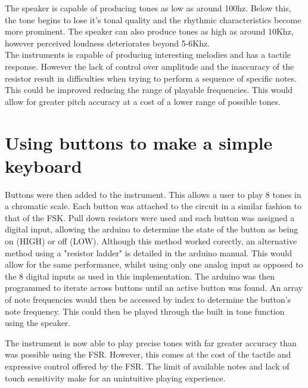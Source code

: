 \documentclass[titlepage]{scrartcl}
\begin{document}
    \begin{figure}[H]
    \end{figure}

    The speaker is capable of producing tones as low as around 100hz. Below
    this, the tone begins to lose it's tonal quality and the rhythmic
    characteristics become more prominent. The speaker can also produce tones
    as high as around 10Khz, however perceived loudness deteriorates beyond
    5-6Khz.\\
    The instruments is capable of producing interesting melodies and has a
    tactile response. However the lack of control over amplitude and the
    inaccuracy of the resistor result in difficulties when trying to perform a
    sequence of specific notes. This could be improved reducing the range of
    playable frequencies. This would allow for greater pitch accuracy at a cost
    of a lower range of possible tones.

    \section{Using buttons to make a simple keyboard}
    Buttons were then added to the instrument. This allows a user to play 8
    tones in a chromatic scale. Each button was attached to the circuit in a
    similar fashion to that of the FSK. Pull down resistors were used and each
    button was assigned a digital input, allowing the arduino to determine the
    state of the button as being on (HIGH) or off (LOW). Although this method
    worked corectly, an alternative method using a "resistor ladder" is
    detailed in the arduino manual. This would allow for the same performance,
    whilst using only one analog input as opposed to the 8 digital inputs as
    used in this implementation.
    The arduino was then programmed to iterate across buttons until an active
    button was found. An array of note frequencies would then be accessed by
    index to determine the button's note frequency. This could then be played
    through the built in tone function using the speaker.\\

    \begin{figure}[H]
    \end{figure}

    The instrument is now able to play precise tones with far greater accuracy
    than was possible using the FSR. However, this comes at the cost of the
    tactile and expressive control offered by the FSR. The limit of available
    notes and lack of touch sensitivity make for an unintuitive playing
    experience.
\end{document}
